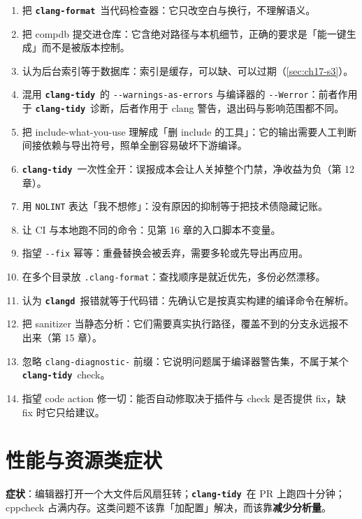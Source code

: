 \documentclass[12pt,a4paper,fontset=fandol]{ctexbook}
\newcommand{\Opt}[1]{\texttt{-\/-#1}}
\newcommand{\Bk}{\discretionary{}{}{}}
\newcommand{\Lib}[1]{\textbf{\texttt{#1}}}
\newcommand{\Tidy}{\Lib{clang-tidy}}
\newcommand{\Fmt}{\Lib{clang-format}}
\newcommand{\CD}{\Lib{clangd}}
\begin{document}
\begin{enumerate}
  \item 把 \Fmt\ 当代码检查器：它只改空白与换行，不理解语义。
  \item 把 compdb 提交进仓库：它含绝对路径与本机细节，正确的要求是「能一键生成」而不是被版本控制。
  \item 认为后台索引等于数据库：索引是缓存，可以缺、可以过期（\ref{sec:ch17-s3}）。
  \item 混用 \Tidy\ 的 \Opt{warnings-as-errors} 与编译器的 \Opt{Werror}：前者作用于 \Tidy\ 诊断，后者作用于 clang 警告，退出码与影响范围都不同。
  \item 把 include-what-you-use 理解成「删 include 的工具」：它的输出需要人工判断间接依赖与导出符号，照单全删容易破坏下游编译。
  \item \Tidy\ 一次性全开：误报成本会让人关掉整个门禁，净收益为负（第 12 章）。
  \item 用 \texttt{NOLINT} 表达「我不想修」：没有原因的抑制等于把技术债隐藏记账。
  \item 让 CI 与本地跑不同的命令：见第 16 章的入口脚本不变量。
  \item 指望 \Opt{fix} 幂等：重叠替换会被丢弃，需要多轮或先导出再应用。
  \item 在多个目录放 \texttt{.clang-format}：查找顺序是就近优先，多份必然漂移。
  \item 认为 \CD\ 报错就等于代码错：先确认它是按真实构建的编译命令在解析。
  \item 把 sanitizer 当静态分析：它们需要真实执行路径，覆盖不到的分支永远报不出来（第 15 章）。
  \item 忽略 \texttt{clang-{\Bk}diagnostic-} 前缀：它说明问题属于编译器警告集，不属于某个 \Tidy\ check。
  \item 指望 code action 修一切：能否自动修取决于插件与 check 是否提供 fix，缺 fix 时它只给建议。
\end{enumerate}

\section{性能与资源类症状}\label{sec:ch17-s16}

\textbf{症状}：编辑器打开一个大文件后风扇狂转；\Tidy\ 在 PR 上跑四十分钟；cppcheck 占满内存。这类问题不该靠「加配置」解决，而该靠\textbf{减少分析量}。
\end{document}
